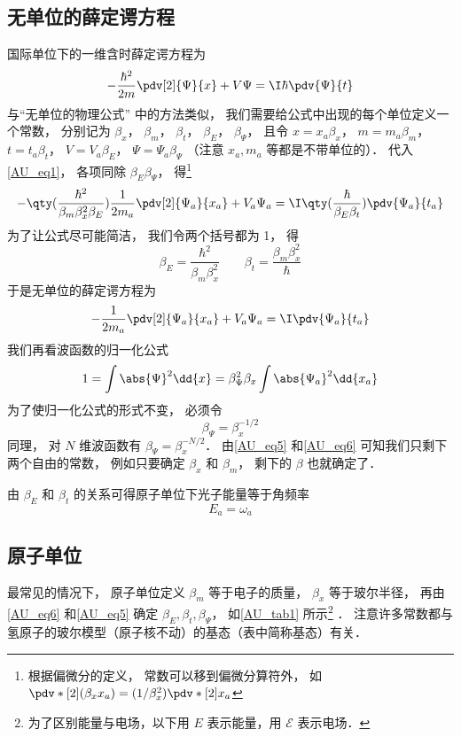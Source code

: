 \subsection{无单位的薛定谔方程}
国际单位下的一维含时薛定谔方程为
\begin{equation}\label{AU_eq1}
-\frac{\hbar^2}{2m} \pdv[2]{\Psi}{x} + V\Psi= \I\hbar \pdv{\Psi}{t}
\end{equation}
与“无单位的物理公式” 中的方法类似， 我们需要给公式中出现的每个单位定义一个常数， 分别记为 $\beta_x$， $\beta_m$， $\beta_t$， $\beta_E$， $\beta_\Psi$， 且令 $x = x_a\beta_x$， $m = m_a\beta_m$， $t = t_a\beta_t$， $V = V_a\beta_E$， $\Psi = \Psi_a \beta_\Psi$ （注意 $x_a, m_a$ 等都是不带单位的）．
代入\autoref{AU_eq1}， 各项同除 $\beta_E\beta_\Psi$， 得\footnote{根据偏微分的定义， 常数可以移到偏微分算符外， 如 $\pdv*[2]{(\beta_x x_a)} = (1/\beta_x^2) \pdv*[2]{x_a}$}
\begin{equation}
-\qty(\frac{\hbar^2}{\beta_m\beta_x^2\beta_E})\frac{1}{2m_a} \pdv[2]{\Psi_a}{x_a} + V_a\Psi_a= \I\qty(\frac{\hbar}{\beta_E\beta_t})\pdv{\Psi_a}{t_a}
\end{equation}
为了让公式尽可能简洁， 我们令两个括号都为 1， 得
\begin{equation}\label{AU_eq6}
\beta_E = \frac{\hbar^2}{\beta_m\beta_x^2}
\qquad
\beta_t = \frac{\beta_m\beta_x^2}{\hbar}
\end{equation}
于是无单位的薛定谔方程为
\begin{equation}\label{AU_eq4}
-\frac{1}{2m_a} \pdv[2]{\Psi_a}{x_a} + V_a\Psi_a= \I\pdv{\Psi_a}{t_a}
\end{equation}
我们再看波函数的归一化公式
\begin{equation}
1 = \int \abs{\Psi}^2 \dd{x} = \beta_\Psi^2 \beta_x \int \abs{\Psi_a}^2 \dd{x_a}
\end{equation}
为了使归一化公式的形式不变， 必须令
\begin{equation}\label{AU_eq5}
\beta_\Psi = \beta_x^{-1/2}
\end{equation}
同理， 对 $N$ 维波函数有 $\beta_\Psi = \beta_x^{-N/2}$．
由\autoref{AU_eq5} 和\autoref{AU_eq6} 可知我们只剩下两个自由的常数， 例如只要确定 $\beta_x$ 和 $\beta_m$， 剩下的 $\beta$ 也就确定了．

由 $\beta_E$ 和 $\beta_t$ 的关系可得原子单位下光子能量等于角频率
\begin{equation}\label{AU_eq2}
E_a = \omega_a
\end{equation}

\subsection{原子单位}
最常见的情况下， 原子单位定义 $\beta_m$ 等于电子的质量， $\beta_x$ 等于玻尔半径， 再由\autoref{AU_eq6} 和\autoref{AU_eq5} 确定 $\beta_E, \beta_t, \beta_\Psi$， 如\autoref{AU_tab1} 所示\footnote{为了区别能量与电场，以下用 $E$ 表示能量，用 $\mathcal{E}$ 表示电场．} ． 注意许多常数都与氢原子的玻尔模型（原子核不动）的基态（表中简称基态）有关．

